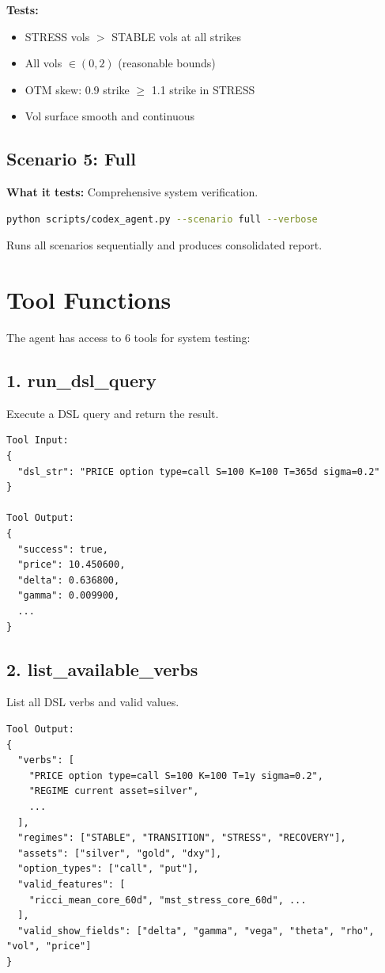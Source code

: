 \documentclass[12pt,oneside,openany]{book}
\begin{document}
\textbf{Tests:}
\begin{itemize}
    \item STRESS vols $>$ STABLE vols at all strikes
    \item All vols $\in (0, 2)$ (reasonable bounds)
    \item OTM skew: 0.9 strike $\geq$ 1.1 strike in STRESS
    \item Vol surface smooth and continuous
\end{itemize}

\subsection{Scenario 5: Full}

\textbf{What it tests:} Comprehensive system verification.

\begin{lstlisting}[language=bash]
python scripts/codex_agent.py --scenario full --verbose
\end{lstlisting}

Runs all scenarios sequentially and produces consolidated report.

\section{Tool Functions}

The agent has access to 6 tools for system testing:

\subsection{1. run\_dsl\_query}

Execute a DSL query and return the result.

\begin{lstlisting}
Tool Input:
{
  "dsl_str": "PRICE option type=call S=100 K=100 T=365d sigma=0.2"
}

Tool Output:
{
  "success": true,
  "price": 10.450600,
  "delta": 0.636800,
  "gamma": 0.009900,
  ...
}
\end{lstlisting}

\subsection{2. list\_available\_verbs}

List all DSL verbs and valid values.

\begin{lstlisting}
Tool Output:
{
  "verbs": [
    "PRICE option type=call S=100 K=100 T=1y sigma=0.2",
    "REGIME current asset=silver",
    ...
  ],
  "regimes": ["STABLE", "TRANSITION", "STRESS", "RECOVERY"],
  "assets": ["silver", "gold", "dxy"],
  "option_types": ["call", "put"],
  "valid_features": [
    "ricci_mean_core_60d", "mst_stress_core_60d", ...
  ],
  "valid_show_fields": ["delta", "gamma", "vega", "theta", "rho", "vol", "price"]
}
\end{lstlisting}
\end{document}

